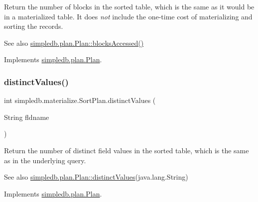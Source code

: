 Return the number of blocks in the sorted table, which is the same as it would be in a materialized table. It does {\itshape not} include the one-\/time cost of materializing and sorting the records. \begin{DoxySeeAlso}{See also}
\hyperlink{interfacesimpledb_1_1plan_1_1Plan_a6a333b95b956fe224812155b9d1c8202}{simpledb.\+plan.\+Plan\+::blocks\+Accessed()} 
\end{DoxySeeAlso}


Implements \hyperlink{interfacesimpledb_1_1plan_1_1Plan_a6a333b95b956fe224812155b9d1c8202}{simpledb.\+plan.\+Plan}.

\mbox{\label{classsimpledb_1_1materialize_1_1SortPlan_a7742b83f40664e6a497f87b0e1df958f}} 
\subsubsection{\texorpdfstring{distinct\+Values()}{distinctValues()}}
{\footnotesize\ttfamily int simpledb.\+materialize.\+Sort\+Plan.\+distinct\+Values (\begin{DoxyParamCaption}\item[{String}]{fldname }\end{DoxyParamCaption})\hspace{0.3cm}{\ttfamily [inline]}}

Return the number of distinct field values in the sorted table, which is the same as in the underlying query. \begin{DoxySeeAlso}{See also}
\hyperlink{interfacesimpledb_1_1plan_1_1Plan_a55094c16c756b0c09b5c71b94d573271}{simpledb.\+plan.\+Plan\+::distinct\+Values}(java.\+lang.\+String) 
\end{DoxySeeAlso}


Implements \hyperlink{interfacesimpledb_1_1plan_1_1Plan_a55094c16c756b0c09b5c71b94d573271}{simpledb.\+plan.\+Plan}.

\mbox{\label{classsimpledb_1_1materialize_1_1SortPlan_ace1a90e7d7d4b498e0b1c6ef5d30e4a4}} 

